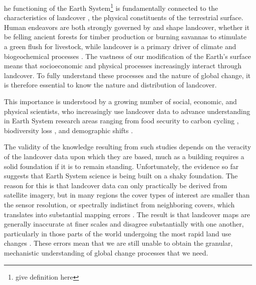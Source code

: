 \documentclass{pnastwo}
\begin{document}
\begin{article}
\begin{abstract}
{Blah blah.}
\end{abstract}


\linenumbers

he functioning of the Earth System\footnote{give definition here} is fundamentally connected to the characteristics of landcover \cite{lambin_modelling_1997}, the physical constituents of the terrestrial surface. Human endeavors are both strongly governed by and shape landcover, whether it be felling ancient forests for timber production or burning savannas to stimulate a green flush for livestock, while landcover is a primary driver of climate and biogeochemical processes \cite{lambin_dynamics_2003}. The vastness of our modification of the Earth's surface \cite{lambin_dynamics_2003} means that socioeconomic and physical processes increasingly interact through landcover. To fully understand these processes and the nature of global change, it is therefore essential to know the nature and distribution of landcover.  

This importance is understood by a growing number of social, economic, and physical scientists, who increasingly use landcover data to advance understanding in Earth System research areas ranging from food security \cite{lark_cropland_2015,wright_recent_2013, licker_mind_2010} to carbon cycling \cite{asner_high-resolution_2010, gaveau_major_2014}, biodiversity loss \cite{newbold_global_2015, luoto_predicting_2004}, and demographic shifts \cite{linard_assessing_2010}. 

The validity of the knowledge resulting from such studies depends on the veracity of the landcover data upon which they are based, much as a building requires a solid foundation if it is to remain standing.  Unfortunately, the evidence so far suggests that Earth System science is being built on a shaky foundation. The reason for this is that landcover data can only practically be derived from satellite imagery, but in many regions the cover types of interest are smaller \cite[e.g. smallholder's farms][]{jain_mapping_2013} than the sensor resolution, or spectrally indistinct from neighboring covers, which translates into substantial mapping errors \cite{see_improved_2015,lobell_use_2013,estes_diylandcover:_2015}. The result is that landcover maps are generally inaccurate at finer scales and disagree substantially with one another, particularly in those parts of the world undergoing the most rapid land use changes \cite{estes_projected_2013, fritz_comparison_2010, fritz_cropland_2011}. These errors mean that we are still unable to obtain the granular, mechanistic understanding of global change processes that we need. 


\end{article}
\end{document}
